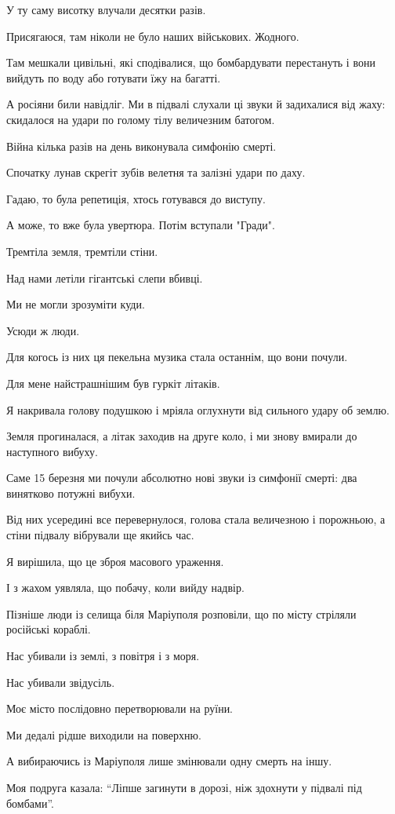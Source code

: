 У ту саму висотку влучали десятки разів. 

Присягаюся, там ніколи не було наших військових. Жодного. 

Там мешкали цивільні, які сподівалися, що бомбардувати перестануть і вони
вийдуть по воду або готувати їжу на багатті. 

А росіяни били навідліг. Ми в підвалі слухали ці звуки й задихалися від жаху:
скидалося на удари по голому тілу величезним батогом.

Війна кілька разів на день виконувала симфонію смерті.

Спочатку лунав скрегіт зубів велетня та залізні удари по даху.

Гадаю, то була репетиція, хтось готувався до виступу. 

А може, то вже була увертюра. Потім вступали "Гради". 

Тремтіла земля, тремтіли стіни.

Над нами летіли гігантські слепи  вбивці. 

Ми не могли зрозуміти куди.

Усюди ж люди. 

Для когось із них ця пекельна  музика стала останнім, що вони почули.

Для мене найстрашнішим був гуркіт літаків. 

Я накривала голову подушкою і мріяла оглухнути від сильного удару об землю. 

Земля прогиналася, а літак заходив на друге коло, і ми знову вмирали до
наступного вибуху.

Саме 15 березня ми почули абсолютно нові звуки із симфонії смерті: два
винятково потужні вибухи.

Від них усередині все перевернулося, голова стала величезною і порожньою, а
стіни підвалу вібрували ще якийсь час.

Я вирішила, що це зброя масового ураження. 

І з жахом уявляла, що побачу, коли вийду надвір.

Пізніше люди із селища біля Маріуполя розповіли, що по місту стріляли російські
кораблі. 

Нас убивали із землі, з повітря і з моря. 

Нас убивали звідусіль. 

Моє місто послідовно перетворювали на руїни.

Ми дедалі рідше виходили на поверхню. 

А вибираючись із Маріуполя лише змінювали одну смерть на іншу.

Моя подруга казала: \enquote{Ліпше загинути в дорозі, ніж здохнути у підвалі під
бомбами}.


